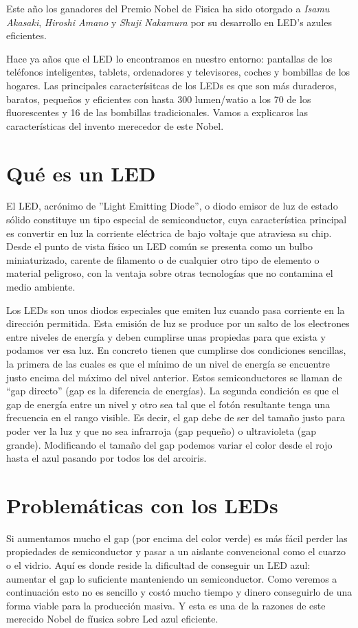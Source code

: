 
Este año los ganadores del Premio Nobel de Fisica ha sido otorgado a
\emph{Isamu Akasaki}, \emph{Hiroshi Amano} y \emph{Shuji Nakamura} por
su desarrollo en LED's azules eficientes.

Hace ya años que el LED lo encontramos en nuestro entorno: pantallas
de los teléfonos inteligentes, tablets, ordenadores y televisores,
coches y bombillas de los hogares. Las principales caracterísitcas de
los LEDs es que son más duraderos, baratos, pequeños y eficientes con
hasta 300 lumen/watio a los 70 de los fluorescentes y 16 de las
bombillas tradicionales. Vamos a explicaros las características del
invento merecedor de este Nobel.


\section{Qué es un LED}

El LED, acrónimo de ''Light Emitting Diode”, o diodo emisor de luz de
estado sólido constituye un tipo especial de
semiconductor, cuya característica principal es convertir en luz la
corriente eléctrica de bajo voltaje que atraviesa su chip. Desde el
punto de vista físico un LED común se presenta como un bulbo
miniaturizado, carente de filamento o de cualquier otro tipo de
elemento o material peligroso, con la ventaja sobre otras tecnologías
que no contamina el medio ambiente.

Los LEDs son unos diodos especiales que emiten luz cuando pasa
corriente en la dirección permitida. Esta emisión de luz se produce
por un salto de los electrones entre niveles de energía y deben
cumplirse unas propiedas para que exista y podamos ver esa luz. En
concreto tienen que cumplirse dos condiciones sencillas, la primera de
las cuales es que el mínimo de un nivel de energía se encuentre justo
encima del máximo del nivel anterior. Estos semiconductores se llaman
de “gap directo” (gap es la diferencia de energías). La segunda
condición es que el gap de energía entre un nivel y otro sea tal que
el fotón resultante tenga una frecuencia en el rango visible. Es
decir, el gap debe de ser del tamaño justo para poder ver la luz y que
no sea infrarroja (gap pequeño) o ultravioleta (gap
grande). Modificando el tamaño del gap podemos variar el color desde
el rojo hasta el azul pasando por todos los del arcoiris.


\section{Problemáticas con los LEDs}
Si aumentamos mucho el gap (por encima del color verde) es más fácil
perder las propiedades de semiconductor y pasar a un aislante
convencional como el cuarzo o el vidrio. Aquí es donde reside la
dificultad de conseguir un LED azul: aumentar el gap lo suficiente
manteniendo un semiconductor. Como veremos a continuación esto no es
sencillo y costó mucho tiempo y dinero conseguirlo de una forma viable
para la producción masiva. Y esta es una de la razones de este
merecido Nobel de fíusica sobre Led azul eficiente.

